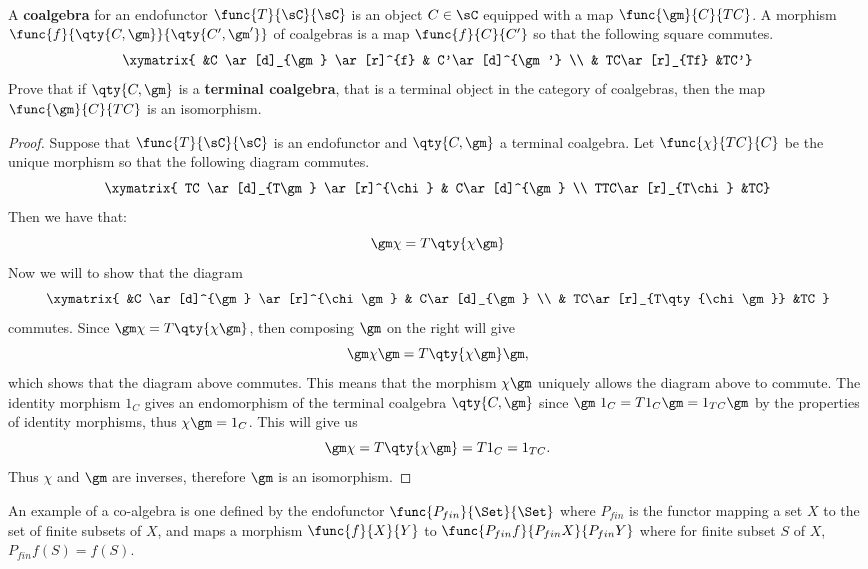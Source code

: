 \documentclass[main.tex]{subfiles}
\begin{document}
\paragraph{}
\begin{exercise}
	A {\bf coalgebra} for an endofunctor $\func{T}{\sC}{\sC}$ is an object $C
	\in \sC$ equipped with a map $\func{\gm}{C}{TC}$. A morphism
	$\func{f}{\qty{C,\gm}}{\qty{C',\gm'}}$ of coalgebras is a map
	$\func{f}{C}{C'}$ so that the following square commutes.
	\[\xymatrix{ &C \ar[d]_{\gm} \ar[r]^{f} & C'\ar[d]^{\gm'}  \\  &
	TC\ar[r]_{Tf} &TC'}\]
	Prove that if $\qty{C,\gm}$ is a {\bf terminal coalgebra}, that is
	a terminal object in the category of coalgebras, then the map
	$\func{\gm}{C}{TC}$ is an isomorphism.
\end{exercise}
\begin{proof}
	Suppose that $\func{T}{\sC}{\sC}$ is an endofunctor and $\qty{C,\gm}$ a
	terminal coalgebra. Let $\func{\chi}{TC}{C}$ be the unique morphism so that
	the following diagram commutes.
	\[\xymatrix{ TC \ar[d]_{T\gm} \ar[r]^{\chi} & C\ar[d]^{\gm} \\
	TTC\ar[r]_{T\chi} &TC}\]
	Then we
	have that: $$ \gm  \chi = T\qty{\chi \gm}    $$ Now we will
	to show that the diagram $$\xymatrix{ &C \ar[d]^{\gm} \ar[r]^{\chi
	\gm} & C\ar[d]_{\gm}  \\  & TC\ar[r]_{T\qty{\chi  \gm}} &TC   } $$
	commutes. Since $ \gm  \chi = T\qty{\chi  \gm}    $, then
	composing $\gm$ on the right will give $$ \gm  \chi  \gm =
	T\qty{\chi  \gm}  \gm,   $$ which shows that the diagram above
	commutes. This means that the morphism $\chi  \gm$ uniquely allows
	the diagram above to commute. The identity morphism $1_C$ gives an
	endomorphism of the terminal coalgebra $\qty{C,\gm}$ since $\gm  \
	1_{C} = T1_{C}  \gm = 1_{TC}  \gm$ by the properties of
	identity morphisms, thus $\chi  \gm = 1_{C}$. This will give us
	$$\gm  \chi = T\qty{\chi  \gm}  = T1_{C} = 1_{TC}.$$ Thus
	$\chi$ and $\gm$ are inverses, therefore $\gm$ is an isomorphism.
\end{proof}

An example of a co-algebra is one defined by the endofunctor
$\func{P_{fin}}{\Set}{\Set}$ where $P_{fin}$ is the functor mapping a set $X$ to
the set of finite subsets of $X$, and maps a morphism $\func{f}{X}{Y}$ to
$\func{P_{fin}f}{P_{fin}X}{P_{fin}Y}$ where for finite subset $S$ of $X$,
$P_{fin}f(S) = f(S)$.
\end{document}
